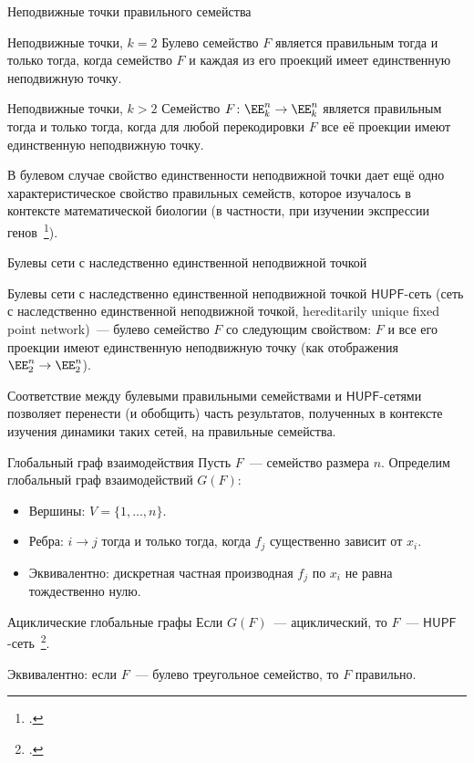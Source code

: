 \begin{frame}{Неподвижные точки правильного семейства}
    \begin{alertblock}{Неподвижные точки, $k=2$}
        Булево семейство $F$ является правильным тогда и только тогда, когда семейство $F$ и каждая из его проекций имеет единственную неподвижную точку.
    \end{alertblock}
    \pause 
    \begin{exampleblock}{Неподвижные точки, $k>2$}
        Семейство $F \colon \EE_k^n \to \EE_k^n$ является правильным тогда и только тогда, когда для любой перекодировки $F$ все её проекции имеют единственную неподвижную точку.
    \end{exampleblock}
    \pause 
    В булевом случае свойство единственности неподвижной точки дает ещё одно характеристическое свойство правильных семейств, которое изучалось в контексте математической биологии (в частности, при изучении экспрессии генов~\footcite{thomas1991regulatory, richard2015fixed, ruet2015asynchronous, ruet2016local}).    
\end{frame}


\begin{frame}{Булевы сети с наследственно единственной неподвижной точкой}
    \begin{block}{Булевы сети с наследственно единственной неподвижной точкой}
        $\mathsf{HUPF}$-сеть (сеть с наследственно единственной неподвижной точкой, hereditarily unique fixed point network)~--- булево семейство $F$ со следующим свойством: $F$ и все его проекции имеют единственную неподвижную точку (как отображения $\EE_2^n \to \EE_2^n$).
    \end{block}
    \pause 
    Соответствие между булевыми правильными семействами и $\mathsf{HUPF}$-сетями позволяет перенести (и обобщить) часть результатов, полученных в контексте изучения динамики таких сетей, на правильные семейства.
\end{frame}


\begin{frame}{Глобальный граф взаимодействия}
    Пусть $F$~--- семейство размера $n$.
    Определим глобальный граф взаимодействий $G(F)$:
    \pause 
    \begin{itemize}
      \item Вершины: $V = \{1, \ldots, n\}$.
      \pause
      \item Ребра: $i \to j$ тогда и только тогда, когда $f_j$ существенно зависит от $x_i$.
      \pause
      \item Эквивалентно: дискретная частная производная $f_j$ по $x_i$ не равна тождественно нулю.
    \end{itemize}
    \pause
    \begin{exampleblock}{Ациклические глобальные графы}
        Если $G(F)$~--- ациклический, то $F$~--- $\mathsf{HUPF}$-сеть~\footcite{robert1980iterations}.
    \end{exampleblock}
    \pause 
    Эквивалентно: если $F$~--- булево треугольное семейство, то $F$ правильно.
\end{frame}



